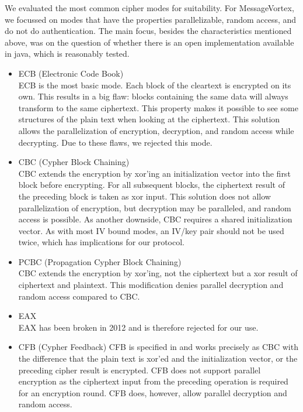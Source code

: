We evaluated the most common cipher modes for suitability. For MessageVortex, we focussed on modes that have the properties parallelizable, random access, and do not do authentication. The main focus, besides the characteristics mentioned above, was on the question of whether there is an open implementation available in java, which is reasonably tested.

\begin{itemize}
	\item ECB (Electronic Code Book)\\
	ECB is the most basic mode. Each block of the cleartext is encrypted on its own. This results in a big flaw: blocks containing the same data will always transform to the same ciphertext. This property makes it possible to see some structures of the plain text when looking at the ciphertext. This solution allows the parallelization of encryption, decryption, and random access while decrypting. Due to these flaws, we rejected this mode.
	\item CBC (Cypher Block Chaining)\\  
	CBC extends the encryption by xor'ing an initialization vector into the first block before encrypting. For all subsequent blocks, the ciphertext result of the preceding block is taken as xor input. This solution does not allow parallelization of encryption, but decryption may be paralleled, and random access is possible. As another downside, CBC requires a shared initialization vector. As with most IV bound modes, an IV/key pair should not be used twice, which has implications for our protocol.
	\item PCBC (Propagation Cypher Block Chaining)\\
	CBC extends the encryption by xor'ing, not the ciphertext but a xor result of ciphertext and plaintext. This modification denies parallel decryption and random access compared to CBC.
	\item EAX\\      
	EAX has been broken in 2012\cite{minematsu2013attacks} and is therefore rejected for our use.
	\item CFB (Cypher Feedback)
	CFB is specified in \cite{dworkin2001recommendation} and works precisely as CBC with the difference that the plain text is xor'ed and the initialization vector, or the preceding cipher result is encrypted. CFB does not support parallel encryption as the ciphertext input from the preceding operation is required for an encryption round. CFB does, however, allow parallel decryption and random access.

\end{itemize}
